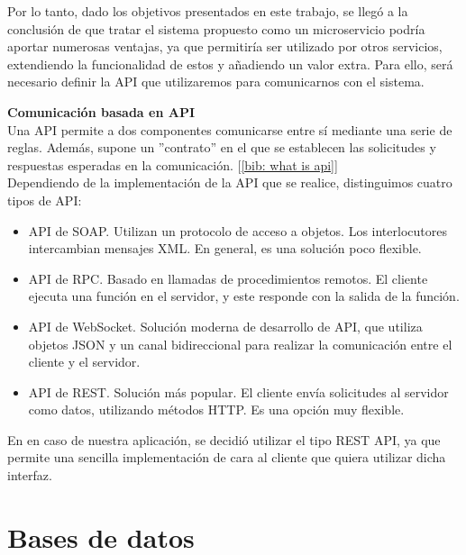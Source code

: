 \documentclass[a4paper, oneside, 12pt]{book}
\begin{document}
	\noindent Por lo tanto, dado los objetivos presentados en este trabajo, se llegó a la conclusión de que tratar el sistema propuesto como un microservicio podría aportar numerosas ventajas, ya que permitiría ser utilizado por otros servicios, extendiendo la funcionalidad de estos y añadiendo un valor extra. Para ello, será necesario definir la API que utilizaremos para comunicarnos con el sistema.
	
	\pagebreak
	
	\noindent \textbf{\large Comunicación basada en \textbf{API}} \\
	
	\noindent Una API permite a dos componentes comunicarse entre sí mediante una serie de reglas. Además, supone un ''contrato'' en el que se establecen las solicitudes y respuestas esperadas en la comunicación. [\ref{bib: what is api}] \\
	
	\noindent Dependiendo de la implementación de la API que se realice, distinguimos cuatro tipos de API:
	
	\begin{itemize}
		\item API de SOAP. Utilizan un protocolo de acceso a objetos. Los interlocutores intercambian mensajes XML. En general, es una solución poco flexible.
		
		\item API de RPC. Basado en llamadas de procedimientos remotos. El cliente ejecuta una función en el servidor, y este responde con la salida de la función.
		
		\item API de WebSocket. Solución moderna de desarrollo de API, que utiliza objetos JSON y un canal bidireccional para realizar la comunicación entre el cliente y el servidor.
		
		\item API de REST. Solución más popular. El cliente envía solicitudes al servidor como datos, utilizando métodos HTTP. Es una opción muy flexible.
	\end{itemize}
	
	\noindent En en caso de nuestra aplicación, se decidió utilizar el tipo REST API, ya que permite una sencilla implementación de cara al cliente que quiera utilizar dicha interfaz.
	
	
	\pagebreak
	
	\section{Bases de datos}
	
\end{document}
